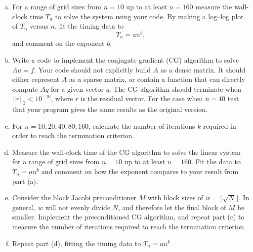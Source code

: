 \documentclass{article}
\begin{document}
\begin{problem}
   \begin{enumerate}[(a)]
    \item For a range of grid sizes from $n=10$ up to at least $n=160$ measure the wall-clock time $T_n$ to solve the system using your code. By making a log--log plot of $T_n$ versus $n$, fit the timing data to $$T_n = a n^b,$$ and comment on the exponent $b$.
    \item Write a code to implement the conjugate gradient (CG) algorithm to solve $Au=f$. Your code should not explicitly build $A$ as a dense matrix. It should either represent $A$ as a sparse matrix, or contain a function that can directly compute $Aq$ for a given vector $q$. The CG algorithm should terminate when $||r||_2 < 10^{-10}$, where $r$ is the residual vector. For the case when $n=40$ test that your program gives the same results as the original version.
    \item For $n=10,20,40,80,160$, calculate the number of iterations $k$ required in order to reach the termination criterion.
    \item Measure the wall-clock time of the CG algorithm to solve the linear system for a range of grid sizes from $n=10$ up to at least $n=160$. Fit the data to $T_n = an^b$ and comment on how the exponent compares to your result from part (a).
    \item Consider the block Jacobi preconditioner $M$ with block sizes of $w=\lfloor \sqrt{N} \rfloor$. In general, $w$ will not evenly divide $N$, and therefore let the final block of $M$ be smaller. Implement the preconditioned CG algorithm, and repeat part (c) to measure the number of iterations required to reach the termination criterion.
    \item Repeat part (d), fitting the timing data to $T_n = an^b$
   \end{enumerate}
\end{problem}
\end{document}
